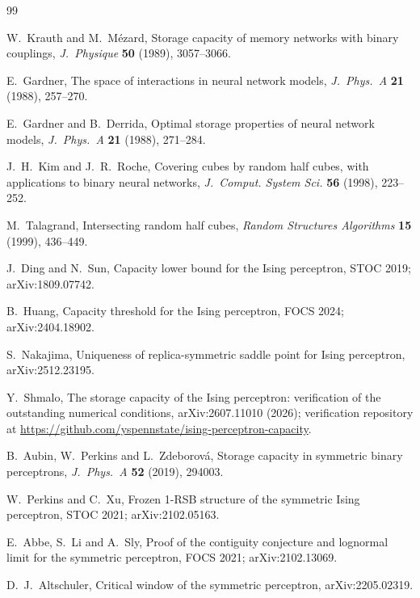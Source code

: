 \documentclass[11pt]{article}
\theoremstyle{remark}
\begin{document}
\begin{thebibliography}{99}

W.~Krauth and M.~M\'ezard,
Storage capacity of memory networks with binary couplings,
\emph{J.~Physique} \textbf{50} (1989), 3057--3066.

E.~Gardner,
The space of interactions in neural network models,
\emph{J.~Phys.~A} \textbf{21} (1988), 257--270.

E.~Gardner and B.~Derrida,
Optimal storage properties of neural network models,
\emph{J.~Phys.~A} \textbf{21} (1988), 271--284.

J.~H.~Kim and J.~R.~Roche,
Covering cubes by random half cubes, with applications to binary
neural networks,
\emph{J.~Comput. System Sci.} \textbf{56} (1998), 223--252.

M.~Talagrand,
Intersecting random half cubes,
\emph{Random Structures Algorithms} \textbf{15} (1999), 436--449.

J.~Ding and N.~Sun,
Capacity lower bound for the Ising perceptron,
STOC 2019; arXiv:1809.07742.

B.~Huang,
Capacity threshold for the Ising perceptron,
FOCS 2024; arXiv:2404.18902.

S.~Nakajima,
Uniqueness of replica-symmetric saddle point for Ising perceptron,
arXiv:2512.23195.

Y.~Shmalo,
The storage capacity of the Ising perceptron: verification of the
outstanding numerical conditions,
arXiv:2607.11010 (2026); verification repository at
\url{https://github.com/yspennstate/ising-perceptron-capacity}.

B.~Aubin, W.~Perkins and L.~Zdeborov\'a,
Storage capacity in symmetric binary perceptrons,
\emph{J.~Phys.~A} \textbf{52} (2019), 294003.

W.~Perkins and C.~Xu,
Frozen 1-RSB structure of the symmetric Ising perceptron,
STOC 2021; arXiv:2102.05163.

E.~Abbe, S.~Li and A.~Sly,
Proof of the contiguity conjecture and lognormal limit for the
symmetric perceptron,
FOCS 2021; arXiv:2102.13069.

D.~J.~Altschuler,
Critical window of the symmetric perceptron,
arXiv:2205.02319.


\end{thebibliography}
\end{document}
